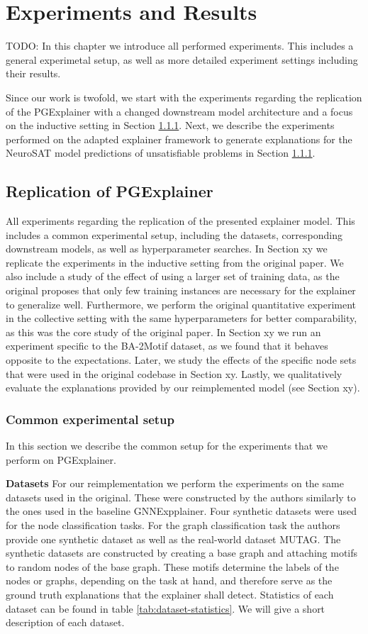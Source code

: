\chapter{Experiments and Results}
\label{ch:Experiments}

TODO: In this chapter we introduce all performed experiments. This includes a general experimetal setup, as well as more detailed experiment settings including their results.

Since our work is twofold, we start with the experiments regarding the replication of the PGExplainer with a changed downstream model architecture and a focus on the inductive setting in Section \ref{}. Next, we describe the experiments performed on the adapted explainer framework to generate explanations for the NeuroSAT model predictions of unsatisfiable problems in Section \ref{}.

\section{Replication of PGExplainer}
All experiments regarding the replication of the presented explainer model. This includes a common experimental setup, including the datasets, corresponding downstream models, as well as hyperparameter searches. In Section xy we replicate the experiments in the inductive setting from the original paper. We also include a study of the effect of using a larger set of training data, as the original proposes that only few training instances are necessary for the explainer to generalize well. Furthermore, we perform the original quantitative experiment in the collective setting with the same hyperparameters for better comparability, as this was the core study of the original paper. In Section xy we run an experiment specific to the BA-2Motif dataset, as we found that it behaves opposite to the expectations. Later, we study the effects of the specific node sets that were used in the original codebase in Section xy. Lastly, we qualitatively evaluate the explanations provided by our reimplemented model (see Section xy).

\subsection{Common experimental setup}
In this section we describe the common setup for the experiments that we perform on PGExplainer.

\textbf{Datasets}
For our reimplementation we perform the experiments on the same datasets used in the original. These were constructed by the authors similarly to the ones used in the baseline GNNExpplainer. Four synthetic datasets were used for the node classification tasks. For the graph classification task the authors provide one synthetic dataset as well as the real-world dataset MUTAG. The synthetic datasets are constructed by creating a base graph and attaching motifs to random nodes of the base graph. These motifs determine the labels of the nodes or graphs, depending on the task at hand, and therefore serve as the ground truth explanations that the explainer shall detect. Statistics of each dataset can be found in table \ref{tab:dataset-statistics}. We will give a short description of each dataset.

